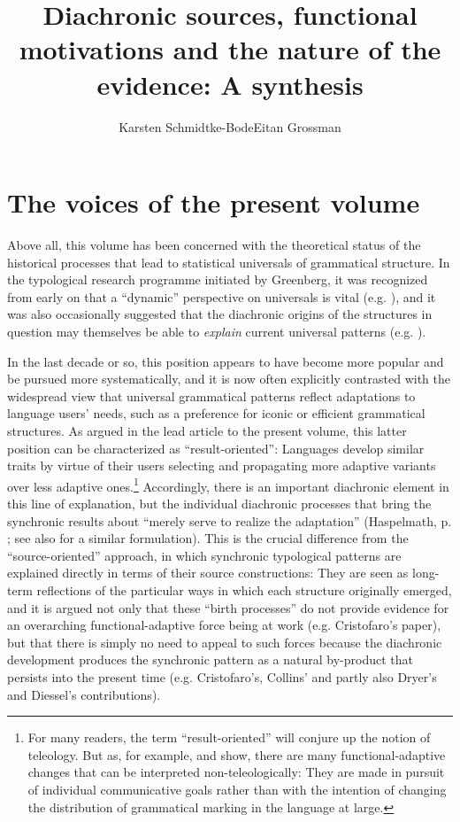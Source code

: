 \documentclass[output=paper]{langsci/langscibook}
\author{Karsten Schmidtke-Bode\affiliation{Leipzig University and Friedrich Schiller University Jena}\lastand Eitan Grossman\affiliation{Hebrew University of Jerusalem}}
\title{Diachronic sources, functional motivations and the nature of the evidence: A synthesis}
\begin{document}
\maketitle 
 
 

\section{The voices of the present volume}\label{sec:epilogue:1}

Above all, this volume has been concerned with the theoretical status of the historical processes that lead to statistical universals of grammatical structure. In the typological research programme initiated by Greenberg, it was recognized from early on that a “dynamic” perspective on universals is vital (e.g. \citealt{Greenberg1969}), and it was also occasionally suggested that the diachronic origins of the structures in question may themselves be able to \textit{explain} current universal patterns (e.g. \citealt{Givón1975,Greenberg1978_Diachr}). 

In the last decade or so, this position appears to have become more popular and be pursued more systematically, and it is now often explicitly contrasted with the widespread view that universal grammatical patterns reflect adaptations to language users’ needs, such as a preference for iconic or efficient grammatical structures. As argued in the lead article to the present volume, this latter position can be characterized as “result-oriented”: Languages develop similar traits by virtue of their users selecting and propagating more adaptive variants over less adaptive ones.\footnote{For many readers, the term “result-oriented” will conjure up the notion of teleology. But as, for example, \citet{Keller1994} and \citet[64--71]{Croft2000_Change} show, there are many functional-adaptive changes that can be interpreted non-teleologically: They are made in pursuit of individual communicative goals rather than with the intention of changing the distribution of grammatical marking in the language at large.} Accordingly, there is an important diachronic element in this line of explanation, but the individual diachronic processes that bring the synchronic results about “merely serve to realize the adaptation” (Haspelmath, p. \pageref{p:haspelmath:merelyserve}; see also \citet[266]{Hawkins2004} for a similar formulation). This is the crucial difference from the “source-oriented” approach, in which synchronic typological patterns are explained directly in terms of their source constructions: They are seen as long-term reflections of the particular ways in which each structure originally emerged, and it is argued not only that these “birth processes” do not provide evidence for an overarching functional-adaptive force being at work (e.g. Cristofaro’s paper), but that there is simply no need to appeal to such forces because the diachronic development produces the synchronic pattern as a natural by-product that persists into the present time (e.g. Cristofaro’s, Collins’ and partly also Dryer’s and Diessel’s contributions). 
\end{document}
